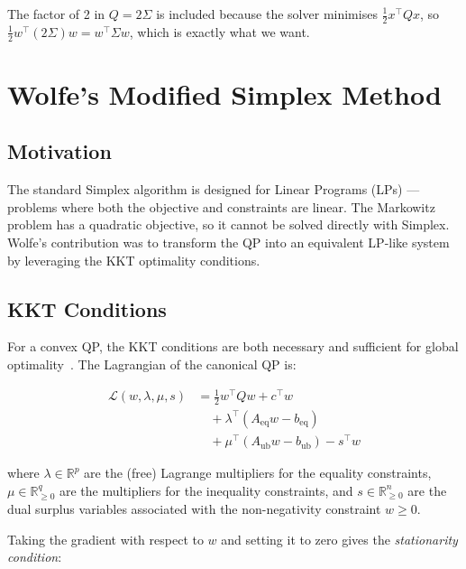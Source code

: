 \documentclass[conference]{IEEEtran}
\begin{document}
The factor of 2 in $Q = 2\Sigma$ is included because the solver minimises
$\frac{1}{2} x^\top Q x$, so $\frac{1}{2} w^\top (2\Sigma) w = w^\top \Sigma w$,
which is exactly what we want.

\section{Wolfe's Modified Simplex Method}

\subsection{Motivation}

The standard Simplex algorithm is designed for Linear Programs (LPs) ---
problems where both the objective and constraints are linear. The Markowitz
problem has a quadratic objective, so it cannot be solved directly with
Simplex. Wolfe's contribution was to transform the QP into an equivalent
LP-like system by leveraging the KKT optimality conditions.

\subsection{KKT Conditions}

For a convex QP, the KKT conditions are both necessary and sufficient for
global optimality~\cite{bazaraa2006}. The Lagrangian of the canonical QP
is:

\begin{equation}
\begin{split}
    \mathcal{L}(w, \lambda, \mu, s) &= \frac{1}{2} w^\top Q w + c^\top w \\
    &\quad + \lambda^\top (A_{\text{eq}} w - b_{\text{eq}}) \\
    &\quad + \mu^\top (A_{\text{ub}} w - b_{\text{ub}}) - s^\top w
\end{split}
\label{eq:lagrangian}
\end{equation}

where $\lambda \in \mathbb{R}^p$ are the (free) Lagrange multipliers for the
equality constraints, $\mu \in \mathbb{R}^q_{\geq 0}$ are the multipliers for
the inequality constraints, and $s \in \mathbb{R}^n_{\geq 0}$ are the dual
surplus variables associated with the non-negativity constraint $w \geq 0$.

Taking the gradient with respect to $w$ and setting it to zero gives the
\textit{stationarity condition}:
\end{document}
